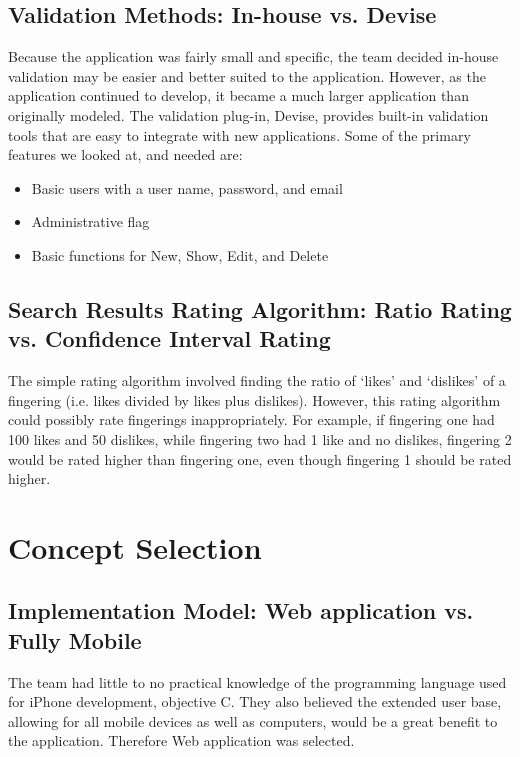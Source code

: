 \documentclass[12pt,english]{article}
\begin{document}
\subsection{Validation Methods: In-house vs. Devise}

Because the application was fairly small and specific, the team decided
in-house validation may be easier and better suited to the application.
However, as the application continued to develop, it became a much
larger application than originally modeled. The validation plug-in,
Devise, provides built-in validation tools that are easy to integrate
with new applications. Some of the primary features we looked at, and
needed are: 
\begin{itemize}
\item Basic users with a user name, password, and email
\item Administrative flag
\item Basic functions for New, Show, Edit, and Delete
\end{itemize}


\subsection{Search Results Rating Algorithm: Ratio Rating vs. Confidence Interval
Rating}

The simple rating algorithm involved finding the ratio of `likes'
and `dislikes' of a fingering (i.e. likes divided by likes plus dislikes).
However, this rating algorithm could possibly rate fingerings inappropriately.
For example, if fingering one had 100 likes and 50 dislikes, while
fingering two had 1 like and no dislikes, fingering 2 would be rated
higher than fingering one, even though fingering 1 should be rated
higher.

\section{Concept Selection}


\subsection{Implementation Model: Web application vs. Fully Mobile}

The team had little to no practical knowledge of the programming language
used for iPhone development, objective C.  They also believed the extended
user base, allowing for all mobile devices as well as computers, would
be a great benefit to the application. Therefore Web application was selected.
\end{document}
